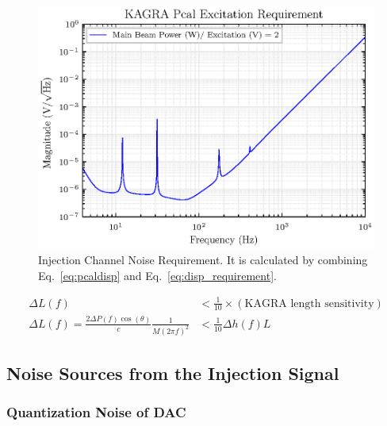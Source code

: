 \begin{figure}[hbt!]
\centering
\includegraphics[width=.9\textwidth]{figure/DAC_requirement.eps}
\caption[Injection Channel Noise Requirement]{Injection Channel Noise Requirement. It is calculated by combining Eq.~\ref{eq:pcaldisp} and Eq.~\ref{eq:disp_requirement}.
}

\label{fig:DAC_noise_requirement}
\end{figure}

\begin{align}
   \Delta L(f) &< \frac{1}{10} \times (\text{KAGRA length sensitivity})\\
   \Delta L(f) =\frac{2 \Delta P(f) \cos(\theta)}{c} \frac{1}{M(2 \pi f)^2} &< \frac{1}{10} \Delta h(f) L
   \label{eq:disp_requirement}
\end{align}




\subsection{Noise Sources from the Injection Signal}
\subsubsection{Quantization Noise of DAC}


